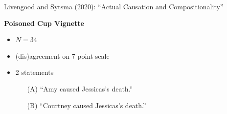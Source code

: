 \documentclass[xcolor=table,9pt,aspectratio=169]{beamer}
\begin{document}
\begin{frame}{\vspace*{10mm}Livengood and Sytsma (2020): ``Actual Causation and Compositionality''}
\vspace*{-5mm}
\begin{multicols}{2}
\textbf{Poisoned Cup Vignette}
\begin{itemize}
   \item $N=34$
   \item (dis)agreement on 7-point scale
   \item 2 statements
   \begin{itemize}
      \item[(A)] ``Amy caused Jessicas's death.''
      \item[(B)] ``Courtney caused Jessicas's death.''
   \end{itemize}
\end{itemize}
\vfill
\begin{center}
\end{center}
\end{multicols}
\end{frame}
\end{document}
